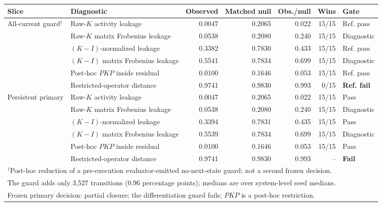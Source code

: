 \begin{tabular}{llrrrrl}
\toprule
Slice & Diagnostic & Observed & Matched null & Obs./null & Wins & Gate \\
\midrule
All-current guard$^{\dagger}$ & Raw-$K$ activity leakage & 0.0047 & 0.2065 & 0.022 & 15/15 & Ref. pass \\
 & Raw-$K$ matrix Frobenius leakage & 0.0538 & 0.2080 & 0.240 & 15/15 & Diagnostic \\
 & $(K-I)$-normalized leakage & 0.3382 & 0.7830 & 0.433 & 15/15 & Ref. pass \\
 & $(K-I)$ matrix Frobenius leakage & 0.5541 & 0.7834 & 0.699 & 15/15 & Diagnostic \\
 & Post-hoc $PKP$ inside residual & 0.0100 & 0.1646 & 0.053 & 15/15 & Ref. pass \\
 & Restricted-operator distance & 0.9741 & 0.9830 & 0.993 & 0/15 & \textbf{Ref. fail} \\
\midrule
Persistent primary & Raw-$K$ activity leakage & 0.0047 & 0.2065 & 0.022 & 15/15 & Pass \\
 & Raw-$K$ matrix Frobenius leakage & 0.0538 & 0.2080 & 0.240 & 15/15 & Diagnostic \\
 & $(K-I)$-normalized leakage & 0.3394 & 0.7831 & 0.435 & 15/15 & Pass \\
 & $(K-I)$ matrix Frobenius leakage & 0.5539 & 0.7834 & 0.699 & 15/15 & Diagnostic \\
 & Post-hoc $PKP$ inside residual & 0.0100 & 0.1646 & 0.053 & 15/15 & Pass \\
 & Restricted-operator distance & 0.9741 & 0.9830 & 0.993 & -- & \textbf{Fail} \\
\midrule
\multicolumn{7}{l}{\footnotesize $^\dagger$Post-hoc reduction of a pre-execution evaluator-emitted no-next-state guard; not a second frozen decision.} \\
\multicolumn{7}{l}{\footnotesize The guard adds only 3,527 transitions (0.96 percentage points); medians are over system-level seed medians.} \\
\multicolumn{7}{l}{\footnotesize Frozen primary decision: partial closure; the differentiation guard fails; $PKP$ is a post-hoc restriction.} \\
\bottomrule
\end{tabular}
